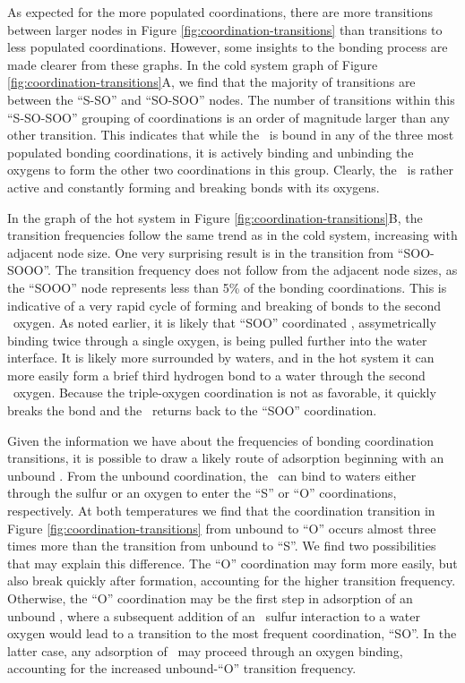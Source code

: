 As expected for the more populated coordinations, there are more transitions between larger nodes in Figure \ref{fig:coordination-transitions} than transitions to less populated coordinations. However, some insights to the bonding process are made clearer from these graphs. In the cold system graph of Figure \ref{fig:coordination-transitions}A, we find that the majority of transitions are between the ``S-SO'' and ``SO-SOO'' nodes. The number of transitions within this ``S-SO-SOO'' grouping of coordinations is an order of magnitude larger than any other transition. This indicates that while the \suldiox~is bound in any of the three most populated bonding coordinations, it is actively binding and unbinding the oxygens to form the other two coordinations in this group. Clearly, the \suldiox~is rather active and constantly forming and breaking bonds with its oxygens.

In the graph of the hot system in Figure \ref{fig:coordination-transitions}B, the transition frequencies follow the same trend as in the cold system, increasing with adjacent node size. One very surprising result is in the transition from ``SOO-SOOO''. The transition frequency does not follow from the adjacent node sizes, as the ``SOOO'' node represents less than 5\% of the bonding coordinations. This is indicative of a very rapid cycle of forming and breaking of bonds to the second \suldiox~oxygen. As noted earlier, it is likely that ``SOO'' coordinated \suldiox, assymetrically binding twice through a single oxygen, is being pulled further into the water interface. It is likely more surrounded by waters, and in the hot system it can more easily form a brief third hydrogen bond to a water through the second \suldiox~oxygen. Because the triple-oxygen coordination is not as favorable, it quickly breaks the bond and the \suldiox~returns back to the ``SOO'' coordination.

Given the information we have about the frequencies of bonding coordination transitions, it is possible to draw a likely route of adsorption beginning with an unbound \suldiox. From the unbound coordination, the \suldiox~can bind to waters either through the sulfur or an oxygen to enter the ``S'' or ``O'' coordinations, respectively. At both temperatures we find that the coordination transition in Figure \ref{fig:coordination-transitions} from unbound to ``O'' occurs almost three times more than the transition from unbound to ``S''. We find two possibilities that may explain this difference. The ``O'' coordination may form more easily, but also break quickly after formation, accounting for the higher transition frequency. Otherwise, the ``O'' coordination may be the first step in adsorption of an unbound \suldiox, where a subsequent addition of an \suldiox~sulfur interaction to a water oxygen would lead to a transition to the most frequent coordination, ``SO''. In the latter case, any adsorption of \suldiox~may proceed through an oxygen binding, accounting for the increased unbound-``O'' transition frequency.


